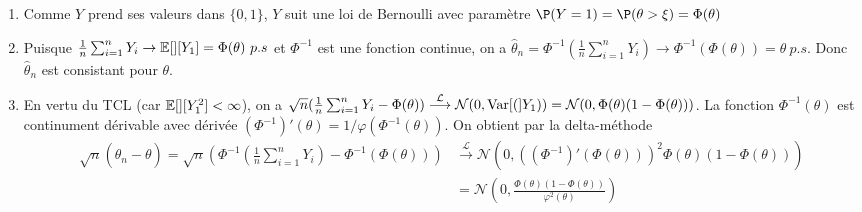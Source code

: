 \begin{solution}
  \begin{enumerate}
    \item
          Comme $Y$ prend ses valeurs dans $\{0,1\}$, $Y$ suit une loi de Bernoulli avec
          param\`etre $\P(Y=1) = \P(\theta>\xi) = \Phi(\theta)$

    \item
          Puisque $\frac1n\sum_{i=1}^n Y_i\to\mathbb{E}[][Y_1]=\Phi(\theta)~p.s$ et $\Phi^{-1}$ est
          une fonction continue, on a $\hat \theta_n=\Phi^{-1}(\frac1n\sum_{i=1}^n Y_i)\to
            \Phi^{-1}(\Phi(\theta))=\theta~p.s$. Donc $\hat\theta_n$ est consistant pour
          $\theta$.

    \item
          En vertu du TCL (car $\mathbb{E}[][Y^2_1]<\infty$), on a $\sqrt
            n(\frac1n\sum_{i=1}^n Y_i-\Phi(\theta))\stackrel{\mathcal
              L}\longrightarrow\mathcal N(0,\operatorname{Var}[(]Y_1))=\mathcal
            N(0,\Phi(\theta)(1-\Phi(\theta)))$. La fonction $\Phi^{-1}(\theta)$ est
          continument d\'erivable avec d\'eriv\'ee $(\Phi^{-1})'(\theta) =
            1/\varphi(\Phi^{-1}(\theta))$. On obtient par la delta-m\'ethode
          \begin{align*}
            \sqrt n(\hat\theta_n-\theta) =\sqrt n\left(\Phi^{-1}\left(\frac1n\sum_{i=1}^n Y_i\right)-\Phi^{-1}(\Phi(\theta))\right)
             & \stackrel{\mathcal L}\longrightarrow \mathcal N(0, {((\Phi^{-1})'(\Phi(\theta)))}^2   \Phi(\theta)(1-\Phi(\theta))) \\
             & =\mathcal N\left(0, \frac{  \Phi(\theta)(1-\Phi(\theta))}{ \varphi^2(\theta)}\right)
          \end{align*}

  \end{enumerate}

\end{solution}
